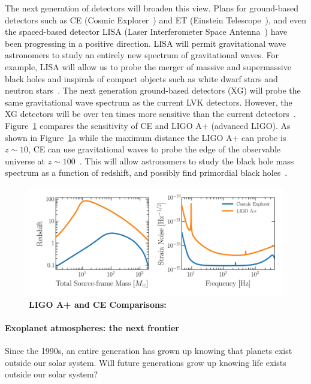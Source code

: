 The next generation  of detectors will broaden this view. 
Plans for ground-based detectors such as CE (Cosmic Explorer~\cite{}) and ET (Einstein Telescope~\cite{}), and even the spaced-based detector LISA (Laser Interferometer Space Antenna~\cite{}) have been progressing in a positive direction. 
LISA will permit gravitational wave astronomers to study an entirely new spectrum of gravitational waves. 
For example, LISA will allow us to probe the merger of massive and supermassive black holes and inspirals of compact objects such as white dwarf stars and neutron stars~\cite{}. 
The next generation ground-based detectors (XG) will probe the same gravitational wave spectrum as the current LVK detectors. 
However, the XG detectors will be over ten times more sensitive than the current detectors~\cite{}. 
Figure~\ref{fig:ligo_vs_ce} compares the sensitivity of CE and LIGO A+ (advanced LIGO). 
As shown in Figure~\ref{fig:ligo_vs_ce}a while the maximum distance the LIGO A+ can probe is $z\sim10$, CE can use gravitational waves to probe the edge of the observable universe at $z\sim100$~\cite{}. 
This will allow astronomers to study the black hole mass spectrum as a function of redshift, and possibly find primordial black holes~\cite{}.
\begin{figure}
\begin{center}
  \centerline{\includegraphics[width=1.\linewidth]{src/figures/ligo_vs_ce.png}}
  \caption{\textbf{LIGO A+ and CE Comparisons:}  }
  \label{fig:ligo_vs_ce}
\end{center}
\end{figure}


\paragraph{Exoplanet atmospheres: the next frontier}

Since the 1990s, an entire generation has grown up knowing that planets exist outside our solar system. Will future generations grow up knowing life exists outside our solar system?

